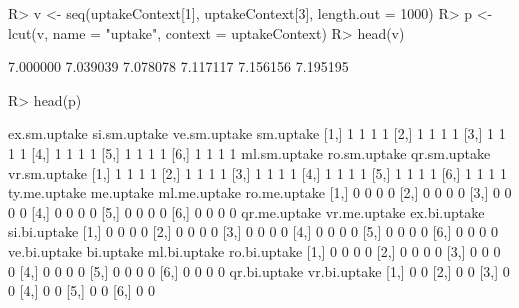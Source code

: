 \begin{Schunk}
% --begin: "pbld5"
\begin{Sinput}
R> v <- seq(uptakeContext[1], uptakeContext[3], length.out = 1000)
R> p <- lcut(v, name = "uptake", context = uptakeContext)
R> head(v)
\end{Sinput}
\begin{Soutput}
[1] 7.000000 7.039039 7.078078 7.117117 7.156156 7.195195
\end{Soutput}
\begin{Sinput}
R> head(p)
\end{Sinput}
\begin{Soutput}
     ex.sm.uptake si.sm.uptake ve.sm.uptake sm.uptake
[1,]            1            1            1         1
[2,]            1            1            1         1
[3,]            1            1            1         1
[4,]            1            1            1         1
[5,]            1            1            1         1
[6,]            1            1            1         1
     ml.sm.uptake ro.sm.uptake qr.sm.uptake vr.sm.uptake
[1,]            1            1            1            1
[2,]            1            1            1            1
[3,]            1            1            1            1
[4,]            1            1            1            1
[5,]            1            1            1            1
[6,]            1            1            1            1
     ty.me.uptake me.uptake ml.me.uptake ro.me.uptake
[1,]            0         0            0            0
[2,]            0         0            0            0
[3,]            0         0            0            0
[4,]            0         0            0            0
[5,]            0         0            0            0
[6,]            0         0            0            0
     qr.me.uptake vr.me.uptake ex.bi.uptake si.bi.uptake
[1,]            0            0            0            0
[2,]            0            0            0            0
[3,]            0            0            0            0
[4,]            0            0            0            0
[5,]            0            0            0            0
[6,]            0            0            0            0
     ve.bi.uptake bi.uptake ml.bi.uptake ro.bi.uptake
[1,]            0         0            0            0
[2,]            0         0            0            0
[3,]            0         0            0            0
[4,]            0         0            0            0
[5,]            0         0            0            0
[6,]            0         0            0            0
     qr.bi.uptake vr.bi.uptake
[1,]            0            0
[2,]            0            0
[3,]            0            0
[4,]            0            0
[5,]            0            0
[6,]            0            0
\end{Soutput}
%
% --end: "pbld5"
\end{Schunk}
